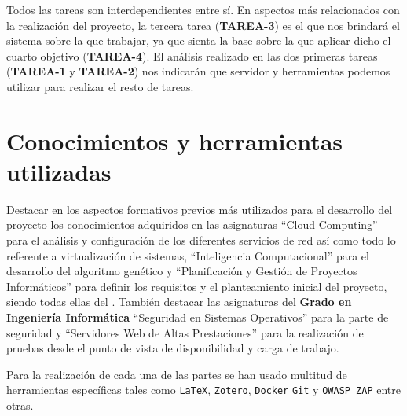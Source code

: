 Todos las tareas son interdependientes entre sí. En aspectos más relacionados con la realización del proyecto, la tercera tarea (\textbf{TAREA-3}) es el que nos brindará el sistema sobre la que trabajar, ya que sienta la base sobre la que aplicar dicho el cuarto objetivo (\textbf{TAREA-4}). El análisis realizado en las dos primeras tareas (\textbf{TAREA-1} y \textbf{TAREA-2}) nos indicarán que servidor y herramientas podemos utilizar para realizar el resto de tareas.

\section{Conocimientos y herramientas utilizadas}

\bigskip
Destacar en los aspectos formativos previos más utilizados para el desarrollo del proyecto los conocimientos adquiridos en las asignaturas ``Cloud Computing'' para el análisis y configuración de los diferentes servicios de red así como todo lo referente a virtualización de sistemas, ``Inteligencia Computacional'' para el desarrollo del algoritmo genético y ``Planificación y Gestión de Proyectos Informáticos'' para definir los requisitos y el planteamiento inicial del proyecto, siendo todas ellas del \textbf{\master}. También destacar las asignaturas del \textbf{Grado en Ingeniería Informática} ``Seguridad en Sistemas Operativos'' para la parte de seguridad y ``Servidores Web de Altas Prestaciones'' para la realización de pruebas desde el punto de vista de disponibilidad y carga de trabajo.

\bigskip
Para la realización de cada una de las partes se han usado multitud de herramientas específicas tales como \texttt{LaTeX}, \texttt{Zotero}, \texttt{Docker} \texttt{Git} y \texttt{OWASP ZAP} entre otras.

